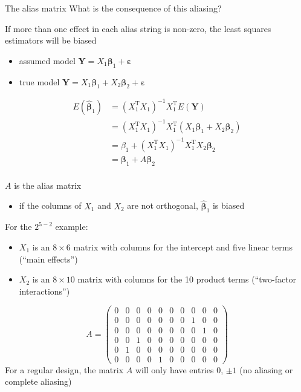 \documentclass[
  ignorenonframetext,
]{beamer}
\providecommand{\tightlist}{%
  \setlength{\itemsep}{0pt}\setlength{\parskip}{0pt}}
\begin{document}
\begin{frame}{The alias matrix}
\protect\hypertarget{the-alias-matrix}{}
What is the consequence of this aliasing?

If more than one effect in each alias string is non-zero, the least
squares estimators will be biased

\begin{itemize}
\tightlist
\item
  assumed model
  \(\boldsymbol{Y}= X_1\boldsymbol{\beta}_1 + \boldsymbol{\varepsilon}\)
\item
  true model
  \(\boldsymbol{Y}= X_1\boldsymbol{\beta}_1 + X_2\boldsymbol{\beta}_2 + \boldsymbol{\varepsilon}\)
\end{itemize}

\[
  \begin{split}
  E\left(\hat{\boldsymbol{\beta}}_1\right) & = \left(X_1^\mathrm{T}X_1\right)^{-1}X^\mathrm{T}_1E(\boldsymbol{Y}) \\
  & = \left(X^\mathrm{T}_1X_1\right)^{-1}X_1^\mathrm{T}\left(X_1\boldsymbol{\beta}_1 + X_2\boldsymbol{\beta}_2\right) \\
  & = \beta_1 + \left(X_1^\mathrm{T}X_1\right)^{-1}X_1^\mathrm{T}X_2\boldsymbol{\beta}_2 \\
  & = \boldsymbol{\beta}_1 + A\boldsymbol{\beta}_2\\
  \end{split}
  \]

\(A\) is the alias matrix

\begin{itemize}
\tightlist
\item
  if the columns of \(X_1\) and \(X_2\) are not orthogonal,
  \(\hat{\boldsymbol{\beta}}_1\) is biased
\end{itemize}
\end{frame}

\begin{frame}{}
\protect\hypertarget{section-14}{}
For the \(2^{5-2}\) example:

\begin{itemize}
\tightlist
\item
  \(X_1\) is an \(8\times 6\) matrix with columns for the intercept and
  five linear terms (``main effects'')
\item
  \(X_2\) is an \(8\times 10\) matrix with columns for the 10 product
  terms (``two-factor interactions'')
\end{itemize}

\[
A = \left(
\begin{array}{cccccccccc}
0 & 0 & 0 & 0 & 0 & 0 & 0 & 0 & 0 & 0 \\
0 & 0 & 0 & 0 & 0 & 0 & 0 & 1 & 0 & 0 \\
0 & 0 & 0 & 0 & 0 & 0 & 0 & 0 & 1 & 0 \\
0 & 0 & 1 & 0 & 0 & 0 & 0 & 0 & 0 & 0 \\
0 & 1 & 0 & 0 & 0 & 0 & 0 & 0 & 0 & 0 \\
0 & 0 & 0 & 0 & 1 & 0 & 0 & 0 & 0 & 0
\end{array}
\right)
\] For a regular design, the matrix \(A\) will only have entries 0,
\(\pm 1\) (no aliasing or complete aliasing)
\end{frame}
\end{document}
